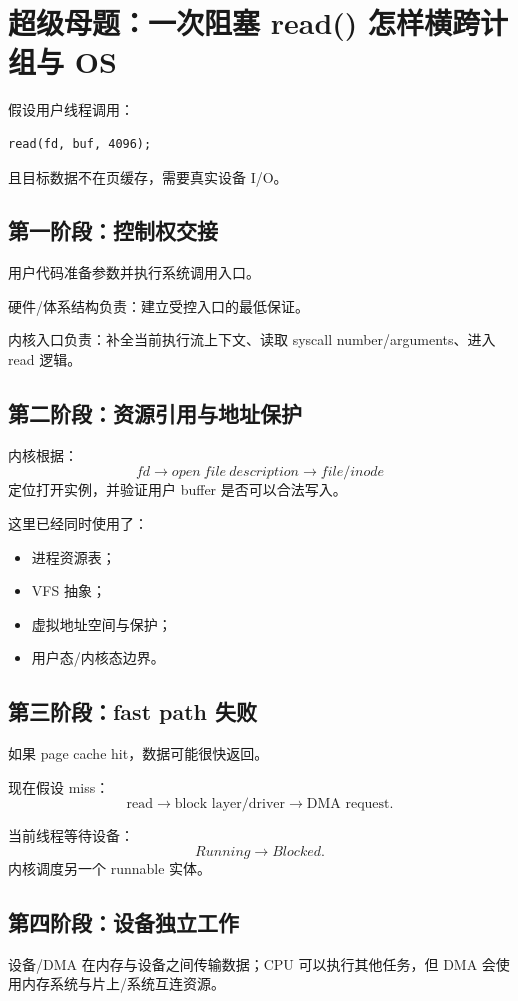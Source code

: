 \documentclass[11pt,a4paper]{ctexart}
\begin{document}
\section{超级母题：一次阻塞 read() 怎样横跨计组与 OS}

假设用户线程调用：
\begin{verbatim}
read(fd, buf, 4096);
\end{verbatim}
且目标数据不在页缓存，需要真实设备 I/O。

\subsection{第一阶段：控制权交接}
用户代码准备参数并执行系统调用入口。

硬件/体系结构负责：建立受控入口的最低保证。

内核入口负责：补全当前执行流上下文、读取 syscall number/arguments、进入 read 逻辑。

\subsection{第二阶段：资源引用与地址保护}
内核根据：
\[
fd\rightarrow open\ file\ description\rightarrow file/inode
\]
定位打开实例，并验证用户 buffer 是否可以合法写入。

这里已经同时使用了：
\begin{itemize}
  \item 进程资源表；
  \item VFS 抽象；
  \item 虚拟地址空间与保护；
  \item 用户态/内核态边界。
\end{itemize}

\subsection{第三阶段：fast path 失败}
如果 page cache hit，数据可能很快返回。

现在假设 miss：
\[
\text{read}
\rightarrow
\text{block layer/driver}
\rightarrow
\text{DMA request}.
\]

当前线程等待设备：
\[
Running\rightarrow Blocked.
\]
内核调度另一个 runnable 实体。

\subsection{第四阶段：设备独立工作}
设备/DMA 在内存与设备之间传输数据；CPU 可以执行其他任务，但 DMA 会使用内存系统与片上/系统互连资源。
\end{document}
